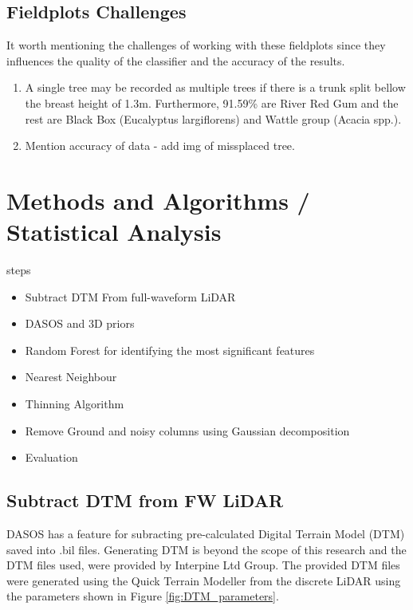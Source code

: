 \documentclass{subfiles}
\begin{document}
\subsection{Fieldplots Challenges}
\par It worth mentioning the challenges of working with these fieldplots since they influences the quality of the classifier and the accuracy of the results. 
\begin{enumerate}
	\item A single tree may be recorded as multiple trees if there is a trunk split bellow the breast height of 1.3m. Furthermore, 91.59\% are River Red Gum and the rest are Black Box (Eucalyptus largiflorens) and Wattle group (Acacia spp.). 
	\item {\color{red} Mention accuracy of data - add img of missplaced tree.}
\end{enumerate}


\section{Methods and Algorithms / Statistical Analysis}

\par steps

\begin{itemize}
	\item Subtract DTM From full-waveform LiDAR
	\item DASOS and 3D priors
	\item Random Forest for identifying the most significant features
	\item Nearest Neighbour 
	\item Thinning Algorithm
	\item Remove Ground and noisy columns using Gaussian decomposition
	\item Evaluation
\end{itemize}

\subsection{Subtract DTM from FW LiDAR}\label{sec:DTMsub}

\par DASOS has a feature for subracting pre-calculated Digital Terrain Model (DTM) saved into .bil files. Generating DTM is beyond the scope of this research and the DTM files used, were provided by Interpine Ltd Group. The provided DTM files were generated using the Quick Terrain Modeller from the discrete LiDAR using the parameters shown in Figure \ref{fig:DTM_parameters}.
\end{document}
